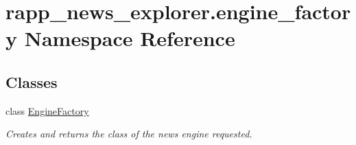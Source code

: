 \hypertarget{namespacerapp__news__explorer_1_1engine__factory}{\section{rapp\-\_\-news\-\_\-explorer.\-engine\-\_\-factory Namespace Reference}
\label{namespacerapp__news__explorer_1_1engine__factory}
}
\subsection*{Classes}
\begin{DoxyCompactItemize}
\item 
class \hyperlink{classrapp__news__explorer_1_1engine__factory_1_1EngineFactory}{Engine\-Factory}
\begin{DoxyCompactList}\small\item\em Creates and returns the class of the news engine requested. \end{DoxyCompactList}\end{DoxyCompactItemize}
